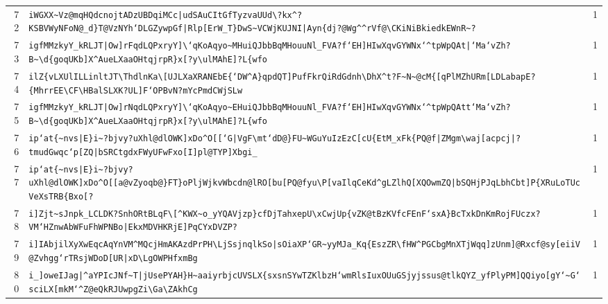 \begin{xltabular}{\textwidth}{@{} r >{\raggedright\arraybackslash}X r @{}}
        72 & \texttt{iWGXX\textasciitilde{}Vz@mqHQdcnojtADzUBDqiMCc|udSAuCItGfTyzvaUUd\textbackslash{}?kx\textasciicircum{}?KSBVWyNFoN@\_d\}T@VzNYh`DLGZywpGf|Rlp[ErW\_T\}DwS\textasciitilde{}VCWjKUJNI|Ayn\{dj?@Wg\textasciicircum{}\textasciicircum{}rVf@\textbackslash{}CKiNiBkiedkEWnR\textasciitilde{}?} & 1 \\
        73 & \texttt{igfMMzkyY\_kRLJT|Ow]rFqdLQPxryY]\textbackslash{}`qKoAqyo\textasciitilde{}MHuiQJbbBqMHouuNl\_FVA?f`EH]HIwXqvGYWNx`\textasciicircum{}tpWpQAt|`Ma`vZh?B\textasciitilde{}\textbackslash{}d\{goqUKb]X\textasciicircum{}AueLXaaOHtqjrpR\}x[?y\textbackslash{}ulMAhE]?L\{wfo} & 1 \\
        74 & \texttt{ilZ\{vLXUlILLinltJT\textbackslash{}ThdlnKa\textbackslash{}[UJLXaXRANEbE\{`DW\textasciicircum{}A\}qpdQT]PufFkrQiRdGdnh\textbackslash{}DhX\textasciicircum{}t?F\textasciitilde{}N\textasciitilde{}@cM\{[qPlMZhURm[LDLabapE?\{MhrrEE\textbackslash{}CF\textbackslash{}HBalSLXK?UL]F`OPBvN?mYcPmdCWjSLw} & 1 \\
        75 & \texttt{igfMMzkyY\_kRLJT|Ow]rNqdLQPxryY]\textbackslash{}`qKoAqyo\textasciitilde{}EHuiQJbbBqMHouuNl\_FVA?f`EH]HIwXqvGYWNx`\textasciicircum{}tpWpQAtt`Ma`vZh?B\textasciitilde{}\textbackslash{}d\{goqUKb]X\textasciicircum{}AueLXaaOHtqjrpR\}x[?y\textbackslash{}ulMAhE]?L\{wfo} & 1 \\
        76 & \texttt{ip`at\{\textasciitilde{}nvs|E\}i\textasciitilde{}?bjvy?uXhl@dlOWK]xDo\textasciicircum{}O[[`G|VgF\textbackslash{}mt`dD@\}FU\textasciitilde{}WGuYuIzEzC[cU\{EtM\_xFk\{PQ@f|ZMgm\textbackslash{}waj[acpcj|?tmudGwqc`p[ZQ|bSRCtgdxFWyUFwFxo[I]pl@TYP]Xbgi\_} & 1 \\
        77 & \texttt{ip`at\{\textasciitilde{}nvs|E\}i\textasciitilde{}?bjvy?uXhl@dlOWK]xDo\textasciicircum{}O[[a@vZyoqb@\}FT\}oPljWjkvWbcdn@lRO[bu[PQ@fyu\textbackslash{}P[vaIlqCeKd\textasciicircum{}gLZlhQ[XQOwmZQ|bSQHjPJqLbhCbt]P\{XRuLoTUcVeXsTRB\{Bxo[?} & 1 \\
        78 & \texttt{i]Zjt\textasciitilde{}sJnpk\_LCLDK?SnhORtBLqF\textbackslash{}[\textasciicircum{}KWX\textasciitilde{}o\_yYQAVjzp\}cfDjTahxepU\textbackslash{}xCwjUp\{vZK@tBzKVfcFEnF`sxA\}BcTxkDnKmRojFUczx?VM`HZnwAbWFuFhWPNBo|EkxMDVHKRjE]PqCYxDVZP?} & 1 \\
        79 & \texttt{i]IAbjilXyXwEqcAqYnVM\textasciicircum{}MQcjHmAKAzdPrPH\textbackslash{}LjSsjnqlkSo|sOiaXP`GR\textasciitilde{}yyMJa\_Kq\{EszZR\textbackslash{}fHW\textasciicircum{}PGCbgMnXTjWqq]zUnm]@Rxcf@sy[eiiV@Zvhgg`rTRsjWDoD[UR|xD\textbackslash{}LgOWPHfxmBg} & 1 \\
        80 & \texttt{i\_]oweIJag|\textasciicircum{}aYPIcJNf\textasciitilde{}T|jUsePYAH\}H\textasciitilde{}aaiyrbjcUVSLX\{sxsnSYwTZKlbzH`wmRlsIuxOUuGSjyjssus@tlkQYZ\_yfPlyPM]QQiyo[gY`\textasciitilde{}G`sciLX[mkM`\textasciicircum{}Z@eQkRJUwpgZi\textbackslash{}Ga\textbackslash{}ZAkhCg} & 1 \\
\end{xltabular}
\endgroup
    